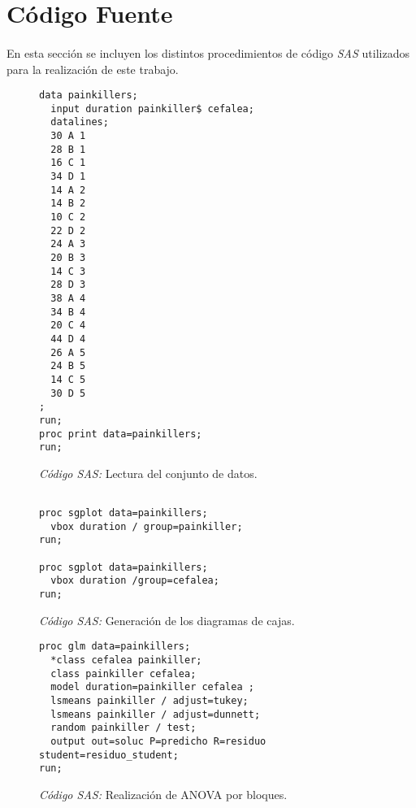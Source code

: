 \documentclass[11pt]{article}
\begin{document}
  \section{Código Fuente}

    \paragraph{}
    En esta sección se incluyen los distintos procedimientos de código \emph{SAS} utilizados para la realización de este trabajo.

    \begin{figure}[H]
      \centering
      \begin{verbatim}
data painkillers;
  input duration painkiller$ cefalea;
  datalines;
  30 A 1
  28 B 1
  16 C 1
  34 D 1
  14 A 2
  14 B 2
  10 C 2
  22 D 2
  24 A 3
  20 B 3
  14 C 3
  28 D 3
  38 A 4
  34 B 4
  20 C 4
  44 D 4
  26 A 5
  24 B 5
  14 C 5
  30 D 5
;
run;
proc print data=painkillers;
run;
      \end{verbatim}
      \caption{\emph{Código SAS:} Lectura del conjunto de datos.}
      \label{code:sas_1}
    \end{figure}

    \begin{figure}[H]
      \centering
      \begin{verbatim}

proc sgplot data=painkillers;
  vbox duration / group=painkiller;
run;

proc sgplot data=painkillers;
  vbox duration /group=cefalea;
run;
      \end{verbatim}
      \caption{\emph{Código SAS:} Generación de los diagramas de cajas.}
      \label{code:sas_2}
    \end{figure}

    \begin{figure}[H]
      \centering
      \begin{verbatim}
proc glm data=painkillers;
  *class cefalea painkiller;
  class painkiller cefalea;
  model duration=painkiller cefalea ;
  lsmeans painkiller / adjust=tukey;
  lsmeans painkiller / adjust=dunnett;
  random painkiller / test;
  output out=soluc P=predicho R=residuo student=residuo_student;
run;
      \end{verbatim}
      \caption{\emph{Código SAS:} Realización de ANOVA por bloques.}
      \label{code:sas_3}
    \end{figure}
\end{document}
